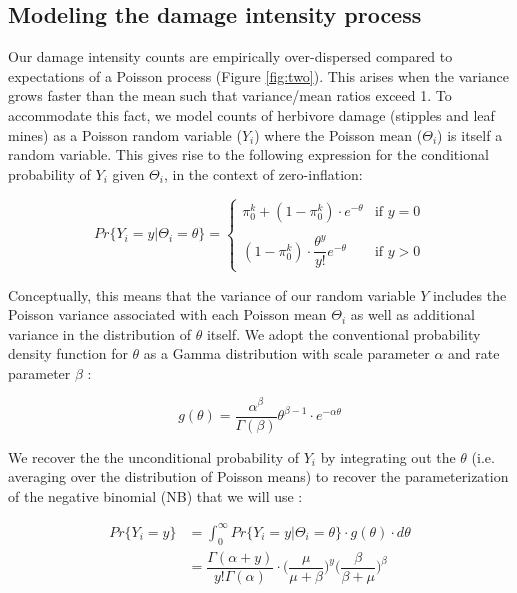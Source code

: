 \documentclass[11pt, oneside]{amsart}
\begin{document}
\subsection{Modeling the damage intensity process}

Our damage intensity counts are empirically over-dispersed compared to expectations of a Poisson process (Figure \ref{fig:two}). This arises when the variance grows faster than the mean such that variance/mean ratios exceed 1. To accommodate this fact, we model counts of herbivore damage (stipples and leaf mines) as a Poisson random variable ($Y_i$) where the Poisson mean ($\Theta_i$) is itself a random variable. This gives rise to the following expression for the conditional probability of $Y_i$ given $\Theta_i$, in the context of zero-inflation:

\begin{equation}
Pr\Big \{Y_i = y | \Theta_i = \theta \Big \} = \begin{cases}
	\pi^{k}_{0} + (1 - \pi^{k}_{0}) \cdot e^{-\theta} & \text{if } y = 0\\
	\\
    (1-\pi^{k}_{0}) \cdot \dfrac{\theta^{y}}{y!}e^{-\theta} & \text{if } y > 0
	\end{cases}
\end{equation}

Conceptually, this means that the variance of our random variable $Y$ includes the Poisson variance associated with each Poisson mean $\Theta_i$ as well as additional variance in the distribution of $\theta$ itself. We adopt the conventional probability density function for $\theta$ as a Gamma distribution with scale parameter $\alpha$ and rate parameter $\beta$ \cite{Zuur09a}:

$$g(\theta) = \dfrac{\alpha^\beta}{\Gamma(\beta)}\theta^{\beta-1} \cdot e^{-\alpha \theta}$$

We recover the the unconditional probability of $Y_i$ by integrating out the $\theta$ (i.e. averaging over the distribution of Poisson means) to recover the parameterization of the negative binomial (NB) that we will use \cite{Zuur09a}:

\begin{equation}
	\begin{aligned}
		Pr\Big \{Y_i = y \Big \} &= \int^{\infty}_{0} Pr\Big \{Y_i = y | \Theta_i = \theta \Big \} \cdot g(\theta) \cdot d\theta \\ 
        & = \dfrac{\Gamma(\alpha + y)}{y!\Gamma(\alpha)} \cdot \Bigg ( \dfrac{\mu}{\mu + \beta}\Bigg )^{y} \Bigg ( \dfrac{\beta}{\beta + \mu}\Bigg )^\beta
	\end{aligned}
\end{equation}
\end{document}
